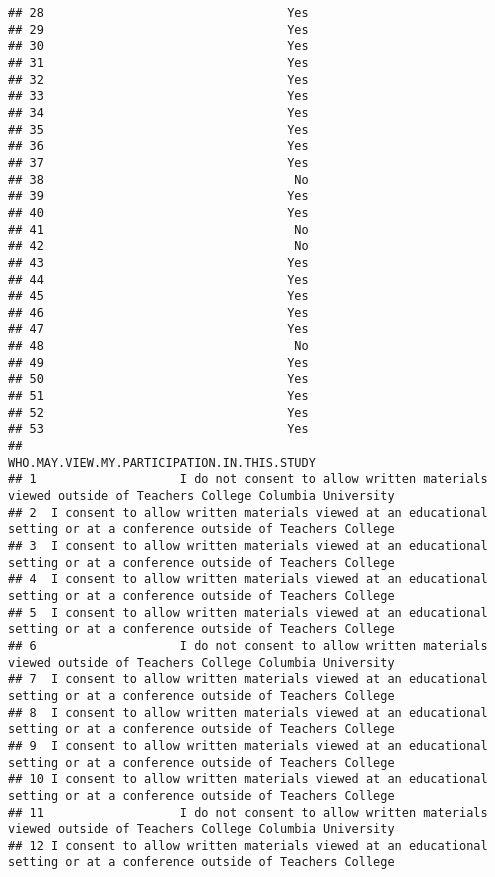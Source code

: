 \documentclass[]{article}
\begin{document}
\begin{verbatim}
## 28                                  Yes
## 29                                  Yes
## 30                                  Yes
## 31                                  Yes
## 32                                  Yes
## 33                                  Yes
## 34                                  Yes
## 35                                  Yes
## 36                                  Yes
## 37                                  Yes
## 38                                   No
## 39                                  Yes
## 40                                  Yes
## 41                                   No
## 42                                   No
## 43                                  Yes
## 44                                  Yes
## 45                                  Yes
## 46                                  Yes
## 47                                  Yes
## 48                                   No
## 49                                  Yes
## 50                                  Yes
## 51                                  Yes
## 52                                  Yes
## 53                                  Yes
##                                                                             WHO.MAY.VIEW.MY.PARTICIPATION.IN.THIS.STUDY
## 1                    I do not consent to allow written materials viewed outside of Teachers College Columbia University
## 2  I consent to allow written materials viewed at an educational setting or at a conference outside of Teachers College
## 3  I consent to allow written materials viewed at an educational setting or at a conference outside of Teachers College
## 4  I consent to allow written materials viewed at an educational setting or at a conference outside of Teachers College
## 5  I consent to allow written materials viewed at an educational setting or at a conference outside of Teachers College
## 6                    I do not consent to allow written materials viewed outside of Teachers College Columbia University
## 7  I consent to allow written materials viewed at an educational setting or at a conference outside of Teachers College
## 8  I consent to allow written materials viewed at an educational setting or at a conference outside of Teachers College
## 9  I consent to allow written materials viewed at an educational setting or at a conference outside of Teachers College
## 10 I consent to allow written materials viewed at an educational setting or at a conference outside of Teachers College
## 11                   I do not consent to allow written materials viewed outside of Teachers College Columbia University
## 12 I consent to allow written materials viewed at an educational setting or at a conference outside of Teachers College

\end{verbatim}
\end{document}
